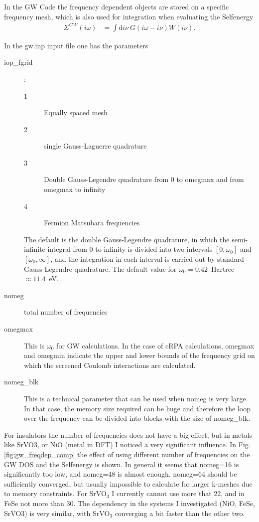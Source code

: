 \documentclass[12pt,a4paper]{scrartcl}
\numberwithin{equation}{section}
\begin{document}
In the GW Code the frequency dependent objects are stored on a specific
frequency mesh, which is also used for integration when evaluating the 
Selfenergy 
\begin{align}
 \Sigma^{GW}(i\omega) &= \int \mathrm{d}{i\nu}\ G(i\omega-i\nu) W(i\nu).
\end{align}

In the gw.inp input file one has the parameters
\begin{description}
\item[iop\_fgrid]:
\begin{description}
 \item[1] Equally spaced mesh
 \item[2] single Gauss-Laguerre quadrature
 \item[3] Double Gauss-Legendre quadrature from 0 to omegmax and from omegmax to infinity
 \item[4] Fermion Matsubara frequencies
\end{description}
The default is the double Gauss-Legendre quadrature, in which the semi-infinite 
integral from 0 to infinity is divided into two intervals $[0, \omega_0]$ and 
$[\omega_0, \infty]$, and the integration in each interval is carried out by 
standard Gauss-Legendre quadrature. The default value for $\omega_0 = 0.42$~Hartree
$\approx 11.4$~eV.
\item[nomeg] total number of frequencies
\item[omegmax] This is $\omega_0$ for GW calculations.
In the case of cRPA calculations, omegmax and omegmin indicate the upper and 
lower bounds of the frequency grid on which the screened Coulomb interactions 
are calculated.
\item[nomeg\_blk] This is a technical parameter that can be used when nomeg is 
very large. In that case, the memory size required can be huge and therefore the 
loop over the frequency can be divided into blocks with the size of nomeg\_blk. 
\end{description}

For insulators the number of frequencies does not have a big effect, 
but in metals like SrVO3, or NiO (metal in DFT) I noticed a very significant influence.
In Fig. \ref{fig:gw_freqdep_comp} the effect of using different number of frequencies
on the GW DOS and the Selfenergy is shown.
In general it seems that nomeg=16 is significantly too low, and 
nomeg=48 is almost enough. nomeg=64 should be sufficiently converged, but
usually impossible to calculate for larger k-meshes due to memory constraints.
For SrVO$_3$ I currently cannot use more that 22, and in FeSe not more than 30.
The dependency in the systems I investigated (NiO, FeSe, SrVO3) is very
similar, with SrVO$_3$ converging a bit faster than the other two.
\end{document}
